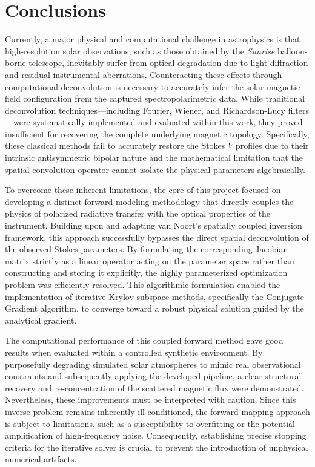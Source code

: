 
\section{Conclusions}

Currently, a major physical and computational challenge in astrophysics is that high-resolution solar observations, such as those obtained by the \textit{Sunrise} balloon-borne telescope, inevitably suffer from optical degradation due to light diffraction and residual instrumental aberrations. Counteracting these effects through computational deconvolution is necessary to accurately infer the solar magnetic field configuration from the captured spectropolarimetric data. While traditional deconvolution techniques---including Fourier, Wiener, and Richardson-Lucy filters---were systematically implemented and evaluated within this work, they proved insufficient for recovering the complete underlying magnetic topology. Specifically, these classical methods fail to accurately restore the Stokes $V$ profiles due to their intrinsic antisymmetric bipolar nature and the mathematical limitation that the spatial convolution operator cannot isolate the physical parameters algebraically.

To overcome these inherent limitations, the core of this project focused on developing a distinct forward modeling methodology that directly couples the physics of polarized radiative transfer with the optical properties of the instrument. Building upon and adapting van Noort's spatially coupled inversion framework, this approach successfully bypasses the direct spatial deconvolution of the observed Stokes parameters. By formulating the corresponding Jacobian matrix strictly as a linear operator acting on the parameter space rather than constructing and storing it explicitly, the highly parameterized optimization problem was efficiently resolved. This algorithmic formulation enabled the implementation of iterative Krylov subspace methods, specifically the Conjugate Gradient algorithm, to converge toward a robust physical solution guided by the analytical gradient.

The computational performance of this coupled forward method gave good results when evaluated within a controlled synthetic environment. By purposefully degrading simulated solar atmospheres to mimic real observational constraints and subsequently applying the developed pipeline, a clear structural recovery and re-concentration of the scattered magnetic flux were demonstrated. Nevertheless, these improvements must be interpreted with caution. Since this inverse problem remains inherently ill-conditioned, the forward mapping approach is subject to limitations, such as a susceptibility to overfitting or the potential amplification of high-frequency noise. Consequently, establishing precise stopping criteria for the iterative solver is crucial to prevent the introduction of unphysical numerical artifacts.

